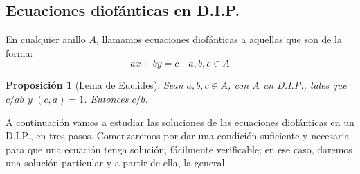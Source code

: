 \documentclass[11pt, a4paper, titlepage]{article}
\theoremstyle{theorem-style}
\newtheorem*{nprop}{Proposición}
\theoremstyle{definition-style}
\theoremstyle{remark-style}
\theoremstyle{example-style}
\begin{document}
\subsection{Ecuaciones diofánticas en D.I.P.}

En cualquier anillo $A$, llamamos ecuaciones diofánticas a aquellas que son de la forma:
\[
ax +by  = c \quad a,b,c \in A
\]

\begin{nprop}[Lema de Euclides]
  Sean $a,b,c \in A$, con $A$ un D.I.P., tales que $c/ab$ y $(c,a)=1$. Entonces $c/b$.
\end{nprop}

A continuación vamos a estudiar las soluciones de las ecuaciones diofánticas en un D.I.P., en tres pasos.
Comenzaremos por dar una condición suficiente y necesaria para que una ecuación tenga solución,
fácilmente verificable; en ese caso, daremos una solución particular y a partir de ella, la general.
\end{document}
